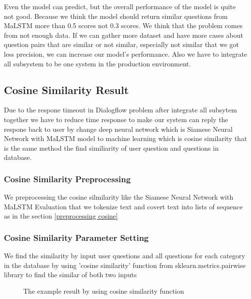 \documentclass[12pt,oneside,openright,a4paper]{cpe-english-project}
\begin{document}
Even the model can predict, but the overall performance of the model is quite not good. Because we think the model should return similar questions from MaLSTM more than 0.5 scores not 0.3 scores. We think that the problem comes from not enough data. If we can gather more dataset and have more cases about question pairs that are similar or not similar, especially not similar that we got less precision, we can increase our model's performance. Also we have to integrate all subsystem to be one system in the production environment.

\subsection{Cosine Similarity Result}
\label{ch4_cosine_similarity_result}
Due to the respone timeout in Dialogflow problem after integrate all subsytem together we have to reduce time response to make our system can reply the respone back to user by change deep neural network which is Siamese Neural Network with MaLSTM model to machine learning which is cosine similarity that is the same method the find similiarity of user question and questions in database.
\subsubsection{Cosine Similarity Preprocessing}
We preprocessing the cosine silmilarity like the Siamese Neural Network with MaLSTM Evaluation that we tokenize
text and covert text into lists of sequence as in the section \ref*{preprocessing cosine}~
\subsubsection{Cosine Similarity Parameter Setting}
We find the similarity by input user questions and all questions for each category in the database by using 'cosine similarity' function from sklearn.metrics.pairwise library to find the similar of both two inputs
\begin{figure}[!h]\centering
{}
\caption{The example result by using cosine similarity function}\label{fig:The example result by using cosine similarity function}
\end{figure}
\pagebreak
\end{document}
